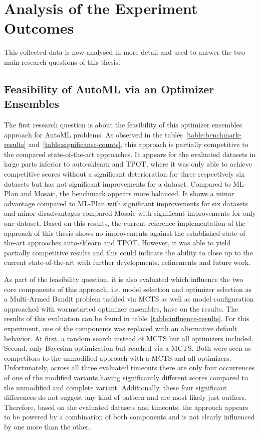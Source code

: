 \section{Analysis of the Experiment Outcomes}
\label{sec:evaluation:analysis}
This collected data is now analysed in more detail and used to answer the two main research questions of this thesis.

\subsection{Feasibility of AutoML via an Optimizer Ensembles}
\label{sec:evaluation:analysis:feasibility}
The first research question is about the feasibility of this optimizer ensembles approach for AutoML problems.\newline
As observed in the  tables~\ref{table:benchmark-results} and~\ref{table:significanse-counts}, this approach is partially competitive to the compared state-of-the-art approaches.
It appears for the evaluated datasets in large parts inferior to auto-sklearn and TPOT, where it was only able to achieve competitive scores without a significant deterioration for three respectively six datasets but has not significant improvements for a dataset.
Compared to ML-Plan and Mosaic, the benchmark appears more balanced.
It shows a minor advantage compared to ML-Plan with significant improvements for six datasets and minor disadvantages compared Mosaic with significant improvements for only one dataset.\newline
Based on this results, the current reference implementation of the approach of this thesis shows no improvements against the established state-of-the-art approaches auto-sklearn and TPOT.
However, it was able to yield partially competitive results and this could indicate the ability to close up to the current state-of-the-art with further developments, refinements and future work.

As part of the feasibility question, it is also evaluated which influence the two core components of this approach, i.e. model selection and optimizer selection as a Multi-Armed Bandit problem tackled via MCTS as well as model configuration approached with warmstarted optimizer ensembles, have on the results.
The results of this evaluation can be found in table~\ref{table:influence-results}.\newline
For this experiment, one of the components was replaced with an alternative default behavior.
At first, a random search instead of MCTS but all optimizers included.
Second, only Bayesian optimization but reached via a MCTS.
Both were seen as competitors to the unmodified approach with a MCTS and all optimizers.\newline
Unfortunately, across all three evaluated timeouts there are only four occurrences of one of the modified variants having significantly different scores compared to the unmodified and complete variant.
Additionally, these four significant differences do not suggest any kind of pattern and are most likely just outliers.
Therefore, based on the evaluated datasets and timeouts, the approach appears to be powered by a combination of both components and is not clearly influenced by one more than the other.

